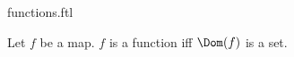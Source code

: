 \documentclass{stex}
\begin{document}
\begin{smodule}{functions.ftl}


\begin{axiom*}[forthel]
  Let $f$ be a map.
  $f$ is a function iff $\Dom(f)$ is a set.
\end{axiom*}

\end{smodule}
\end{document}
